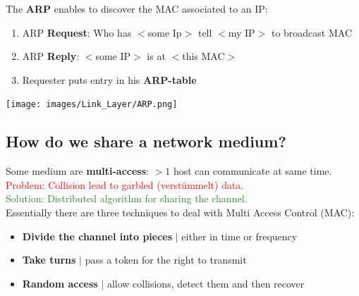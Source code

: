 \documentclass[a4paper, fontsize=8pt, landscape, DIV=1]{scrartcl}
\begin{document}
\begin{multicols*}{4}
		The \textbf{ARP} enables to discover the MAC associated to an IP: 
		\begin{enumerate}[noitemsep]
			\item ARP \textbf{Request}: Who has $<$some Ip$>$ tell $<$my IP$>$ to
			broadcast MAC
			\item ARP \textbf{Reply}: $<$some IP$>$ is at $<$this MAC$>$
			\item Requester puts entry in his \textbf{ARP-table}
		\end{enumerate}
		\texttt{[image: images/Link\_Layer/ARP.png]}
		
		\subsection{How do we share a network medium?}
		Some medium are \textbf{multi-access}: $>1$ host can communicate at same
		time.\\
		\textcolor{Red}{Problem: Collision lead to garbled (verstümmelt) data.}\\
		\textcolor{ForestGreen}{Solution: Distributed algorithm for sharing the
			channel.}\\
		Essentially there are three techniques to deal with Multi Access Control
		(MAC):
		\begin{itemize}[noitemsep]
			\item \textbf{Divide the channel into pieces} $\vert$ either in time or
			frequency
			\item \textbf{Take turns} $\vert$ pass a token for the right to transmit
			\item \textbf{Random access} $\vert$ allow collisions, detect them and
			then recover
		\end{itemize} 
		

\end{multicols*}
\end{document}
